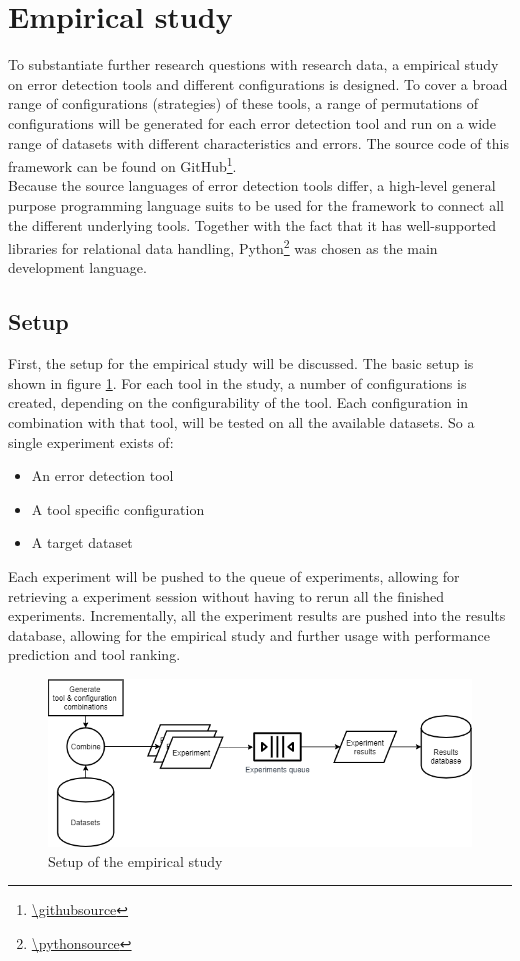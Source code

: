 \section{Empirical study}
\label{sec:empiricalstudy}
To substantiate further research questions with research data, a empirical study on error detection tools and different configurations is designed. To cover a broad range of configurations (strategies) of these tools, a range of permutations of configurations will be generated for each error detection tool and run on a wide range of datasets with different characteristics and errors. The source code of this framework can be found on GitHub\footnote{\url{\githubsource}}.
~\\Because the source languages of error detection tools differ, a high-level general purpose programming language suits to be used for the framework to connect all the different underlying tools. Together with the fact that it has well-supported libraries for relational data handling, Python\footnote{\url{\pythonsource}} was chosen as the main development language.


\subsection{Setup}
\label{subsec:setup}
First, the setup for the empirical study will be discussed. The basic setup is shown in figure \ref{fig:empiricalsetup}. For each tool in the study, a number of configurations is created, depending on the configurability of the tool. Each configuration in combination with that tool, will be tested on all the available datasets. So a single experiment exists of:
\begin{itemize}
    \item An error detection tool
    \item A tool specific configuration
    \item A target dataset
\end{itemize}

Each experiment will be pushed to the queue of experiments, allowing for retrieving a experiment session without having to rerun all the finished experiments. Incrementally, all the experiment results are pushed into the results database, allowing for the empirical study and further usage with performance prediction and tool ranking. 

\begin{figure}[h]
    \centering
    \includegraphics[width=\textwidth]{thesis/Figures/EmpiricalStudy.png}
    \caption{Setup of the empirical study}
    \label{fig:empiricalsetup}
\end{figure}

